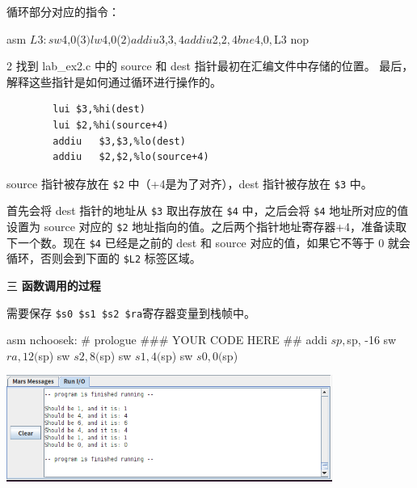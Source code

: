 \documentclass[12pt,a4paper]{article}
\newenvironment{problems}{\begin{list}{}{\renewcommand{\makelabel}[1]{\textbf{##1}.\hfil}}}{\end{list}}
\newenvironment{steps}{\begin{list}{}{\renewcommand{\makelabel}[1]{(##1)\hfil}}}{\end{list}}
\begin{document}
\begin{problems}
\begin{steps}
        循环部分对应的指令：
        \begin{code}{asm}
$L3:
    sw	$4,0($3)
    lw	$4,0($2)
    addiu	$3,$3,4
    addiu	$2,$2,4
    bne	$4,$0,$L3
    nop
        \end{code}
        
        \item[2] 找到 lab\_ex2.c 中的 source 和 dest 指针最初在汇编文件中存储的位置。 最后，解释这些指针是如何通过循环进行操作的。
        
        \begin{verbatim}
        lui	$3,%hi(dest)
        lui	$2,%hi(source+4)
        addiu	$3,$3,%lo(dest)
        addiu	$2,$2,%lo(source+4)
        \end{verbatim}

        source 指针被存放在 \verb"$2" 中（+4是为了对齐），dest 指针被存放在 \verb"$3" 中。

        首先会将 dest 指针的地址从 \verb"$3" 取出存放在 \verb"$4" 中，之后会将 \verb"$4" 地址所对应的值设置为 source 对应的 \verb"$2" 地址指向的值。之后两个指针地址寄存器+4，准备读取下一个数。现在 \verb"$4" 已经是之前的 dest 和 source 对应的值，如果它不等于 0 就会循环，否则会到下面的 \verb"$L2" 标签区域。

    \end{steps}
    \item[三] \textbf{函数调用的过程}
    
    需要保存 \verb"$s0 $s1 $s2 $ra"寄存器变量到栈帧中。
    \begin{code}{asm}
nchoosek:
	# prologue
	### YOUR CODE HERE ##
	addi	    $sp, $sp, -16
	sw	        $ra, 12($sp)
	sw	        $s2, 8($sp)
	sw	        $s1, 4($sp)
	sw	        $s0, 0($sp)
    \end{code}


    \includegraphics[width=0.8\textwidth]{ex3.png}

\end{problems}
\end{document}
